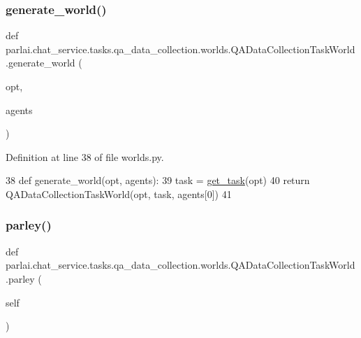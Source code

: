 \subsubsection{\texorpdfstring{generate\+\_\+world()}{generate\_world()}}
{\footnotesize\ttfamily def parlai.\+chat\+\_\+service.\+tasks.\+qa\+\_\+data\+\_\+collection.\+worlds.\+Q\+A\+Data\+Collection\+Task\+World.\+generate\+\_\+world (\begin{DoxyParamCaption}\item[{}]{opt,  }\item[{}]{agents }\end{DoxyParamCaption})\hspace{0.3cm}{\ttfamily [static]}}



Definition at line 38 of file worlds.\+py.


\begin{DoxyCode}
38     \textcolor{keyword}{def }generate\_world(opt, agents):
39         task = \hyperlink{namespaceparlai_1_1chat__service_1_1tasks_1_1qa__data__collection_1_1worlds_a2e51acfa39bb591f618ea3716f7d35e0}{get\_task}(opt)
40         \textcolor{keywordflow}{return} QADataCollectionTaskWorld(opt, task, agents[0])
41 
\end{DoxyCode}
\mbox{\label{classparlai_1_1chat__service_1_1tasks_1_1qa__data__collection_1_1worlds_1_1QADataCollectionTaskWorld_a2732be86dc4eba1255f5c27414f345d3}} 
\subsubsection{\texorpdfstring{parley()}{parley()}}
{\footnotesize\ttfamily def parlai.\+chat\+\_\+service.\+tasks.\+qa\+\_\+data\+\_\+collection.\+worlds.\+Q\+A\+Data\+Collection\+Task\+World.\+parley (\begin{DoxyParamCaption}\item[{}]{self }\end{DoxyParamCaption})}



